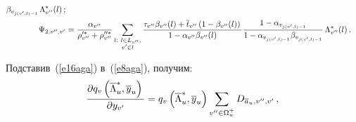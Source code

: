 \begin{align*}
{   \beta_{ v_{j(v^\prime,l)-1}}}\, \Lambda^*_{ v^{\prime\prime}}(l)\,;
\\
   \Psi_{2, v^{\prime\prime}, v^\prime} &=
   \fr{\alpha_{ v^{\prime\prime}}}{\rho_{ v^{\prime\prime}}^{\prime 
*}+\rho_{ v^{\prime\prime}}^{\prime\prime *}} %
   \sum\limits_{\substack{{l:\ l\in L_{ v^{\prime\prime}},}\\ {v^\prime\in l}}} 
   \fr{\tau_{ v^{\prime\prime}}\beta_{ v^{\prime\prime}}(l)+\overline{t}_{ 
v^{\prime\prime}}\left(1-\beta_{ v^{\prime\prime}}(l)\right)}
   {1-\alpha_{ v^{\prime\prime}}\beta_{ v^{\prime\prime}}(l)}
   \fr{1-\alpha_{v_{j(v^\prime,l)-1}}}{1-\alpha_{ v_{j(v^\prime,l)-1}}
   \beta_{ v_{j(v^\prime,l)-1}}}\, \Lambda^*_{ v^{\prime\prime}}(l)\,.
   \end{align*}
   
   
   Подставив~(\ref{e16aga}) в~(\ref{e8aga}), получим:
   \begin{equation}
   \displaystyle\frac{\displaystyle \partial q_v\left(\overline{\Lambda}_u^*, \overline{y}_u\right)\mathstrut}{\displaystyle \partial 
y_{v^\prime}\mathstrut}=q_v\left( \overline{\Lambda}_u^*, 
\overline{y}_u\right)\sum\limits_{ v^{\prime\prime}\in \Omega_u^+} 
D_{\overline{a}_u, v^{\prime\prime}, v^\prime}\,,
   \label{e17aga}
   \end{equation}
   
   
